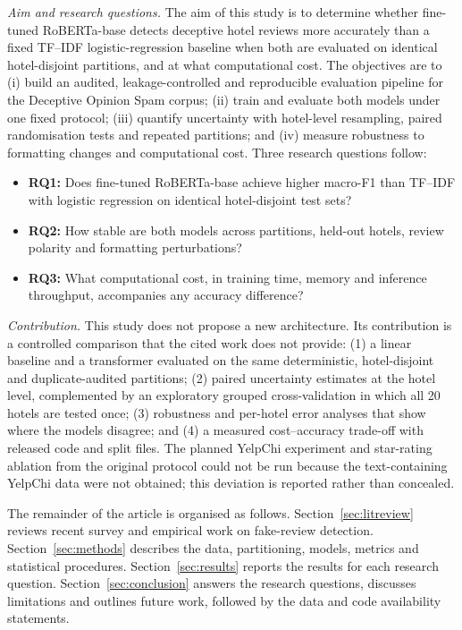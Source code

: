 \emph{Aim and research questions.} The aim of this study is to determine whether fine-tuned RoBERTa-base detects deceptive hotel reviews more accurately than a fixed TF--IDF logistic-regression baseline when both are evaluated on identical hotel-disjoint partitions, and at what computational cost. The objectives are to (i) build an audited, leakage-controlled and reproducible evaluation pipeline for the Deceptive Opinion Spam corpus; (ii) train and evaluate both models under one fixed protocol; (iii) quantify uncertainty with hotel-level resampling, paired randomisation tests and repeated partitions; and (iv) measure robustness to formatting changes and computational cost. Three research questions follow:
\begin{itemize}
\item \textbf{RQ1:} Does fine-tuned RoBERTa-base achieve higher macro-F1 than TF--IDF with logistic regression on identical hotel-disjoint test sets?
\item \textbf{RQ2:} How stable are both models across partitions, held-out hotels, review polarity and formatting perturbations?
\item \textbf{RQ3:} What computational cost, in training time, memory and inference throughput, accompanies any accuracy difference?
\end{itemize}

\emph{Contribution.} This study does not propose a new architecture. Its contribution is a controlled comparison that the cited work does not provide: (1) a linear baseline and a transformer evaluated on the same deterministic, hotel-disjoint and duplicate-audited partitions; (2) paired uncertainty estimates at the hotel level, complemented by an exploratory grouped cross-validation in which all 20 hotels are tested once; (3) robustness and per-hotel error analyses that show where the models disagree; and (4) a measured cost--accuracy trade-off with released code and split files. The planned YelpChi experiment and star-rating ablation from the original protocol could not be run because the text-containing YelpChi data were not obtained; this deviation is reported rather than concealed.

The remainder of the article is organised as follows. Section~\ref{sec:litreview} reviews recent survey and empirical work on fake-review detection. Section~\ref{sec:methods} describes the data, partitioning, models, metrics and statistical procedures. Section~\ref{sec:results} reports the results for each research question. Section~\ref{sec:conclusion} answers the research questions, discusses limitations and outlines future work, followed by the data and code availability statements.
